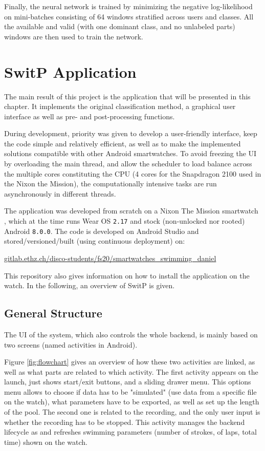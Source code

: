 \documentclass[a4paper, oneside]{discothesis}
\begin{document}
Finally, the neural network is trained by minimizing the negative log-likelihood on mini-batches consisting of 64 windows stratified across users and classes. All the available and valid (with one dominant class, and no unlabeled parts) windows are then used to train the network.

\chapter{SwitP Application}
The main result of this project is the application that will be presented in this chapter. It implements the original classification method, a graphical user interface as well as pre- and post-processing functions.

During development, priority was given to develop a user-friendly interface, keep the code simple and relatively efficient, as well as to make the implemented solutions compatible with other Android smartwatches. To avoid freezing the UI by overloading the main thread, and allow the scheduler to load balance across the multiple cores constituting the CPU (4 cores for the Snapdragon 2100 used in the Nixon the Mission), the computationally intensive tasks are run asynchronously in different threads.

The application was developed from scratch on a Nixon The Mission smartwatch \cite{Miss20}, which at the time runs Wear OS \texttt{2.17} and stock (non-unlocked nor rooted) Android \texttt{8.0.0}. The code is developed on Android Studio and stored/versioned/built (using continuous deployment) on:

\url{gitlab.ethz.ch/disco-students/fs20/smartwatches_swimming_daniel}

This repository also gives information on how to install the application on the watch. In the following, an overview of SwitP is given.

\section{General Structure}
The UI of the system, which also controls the whole backend, is mainly based on two screens (named activities in Android). 

Figure \ref{fig:flowchart} gives an overview of how these two activities are linked, as well as what parts are related to which activity. 
The first activity appears on the launch, just shows start/exit buttons, and a sliding drawer menu. This options menu allows to choose if data has to be "simulated" (use data from a specific file on the watch), what parameters have to be exported, as well as set up the length of the pool. 
The second one is related to the recording, and the only user input is whether the recording has to be stopped. This activity manages the backend lifecycle as and refreshes swimming parameters (number of strokes, of laps, total time) shown on the watch. 
\end{document}
